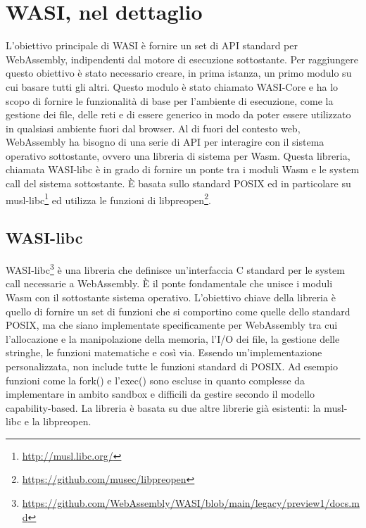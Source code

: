 \chapter{WASI, nel dettaglio}
\label{chap:wasi-in-depth}
L'obiettivo principale di WASI è fornire un set di API standard per WebAssembly, indipendenti dal motore di esecuzione
sottostante. Per raggiungere questo obiettivo è stato necessario creare, in prima istanza, un primo modulo su cui basare
tutti gli altri. Questo modulo è stato chiamato WASI-Core e ha lo scopo di fornire le funzionalità di base per
l'ambiente di esecuzione, come la gestione dei file, delle reti e di essere generico in modo da poter essere utilizzato
in qualsiasi ambiente fuori dal browser. Al di fuori del contesto web, WebAssembly ha bisogno di una serie di API per
interagire con il sistema operativo sottostante, ovvero una libreria di sistema per Wasm. Questa libreria, chiamata
WASI-libc è in grado di fornire un ponte tra i moduli Wasm e le system call del sistema sottostante. È basata sullo
standard POSIX ed in particolare su musl-libc\footnote{\url{http://musl.libc.org/}} ed utilizza le funzioni di
libpreopen\footnote{\url{https://github.com/musec/libpreopen}}.

\section{WASI-libc}
WASI-libc\footnote{\url{https://github.com/WebAssembly/WASI/blob/main/legacy/preview1/docs.md}} è una libreria che
definisce un'interfaccia C standard per le system call necessarie a WebAssembly. È il ponte fondamentale che unisce i
moduli Wasm con il sottostante sistema operativo. L'obiettivo chiave della libreria è quello di fornire un set di
funzioni che si comportino come quelle dello standard POSIX, ma che siano implementate specificamente per WebAssembly
tra cui l'allocazione e la manipolazione della memoria, l'I/O dei file, la gestione delle stringhe, le funzioni
matematiche e così via. Essendo un'implementazione personalizzata, non include tutte le funzioni standard di POSIX. Ad
esempio funzioni come la fork() e l'exec() sono escluse in quanto complesse da implementare in ambito sandbox e
difficili da gestire secondo il modello capability-based. La libreria è basata su due altre librerie già esistenti: la
musl-libc e la libpreopen.
